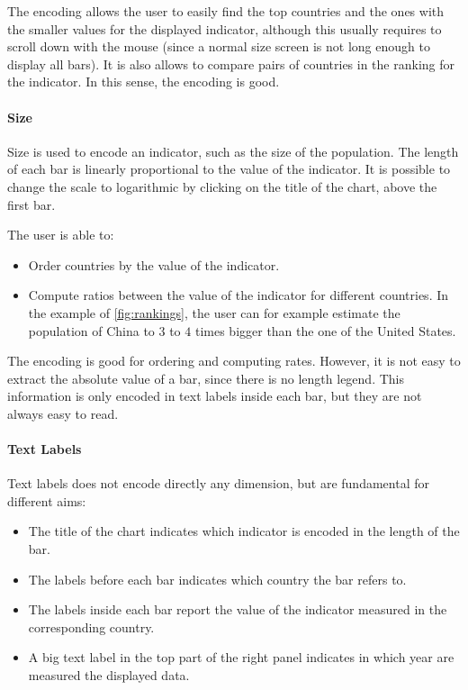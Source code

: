The encoding allows the user to easily find the top countries and the ones with the smaller values for the displayed indicator, although this usually requires to scroll down with the mouse (since a normal size screen is not long enough to display all bars).
It is also allows to compare pairs of countries in the ranking for the indicator.
In this sense, the encoding is good.

\paragraph{Size}
Size is used to encode an indicator, such as the size of the population.
The length of each bar is linearly proportional to the value of the indicator.
It is possible to change the scale to logarithmic by clicking on the title of the chart, above the first bar.

The user is able to:
\begin{itemize}
	\item Order countries by the value of the indicator.
	\item Compute ratios between the value of the indicator for different countries. In the example of \cref{fig:rankings}, the user can for example estimate the population of China to $3$ to $4$ times bigger than the one of the United States.
\end{itemize}

The encoding is good for ordering and computing rates.
However, it is not easy to extract the absolute value of a bar, since there is no length legend.
This information is only encoded in text labels inside each bar, but they are not always easy to read.

\paragraph{Text Labels}
Text labels does not encode directly any dimension, but are fundamental for different aims:
\begin{itemize}
	\item The title of the chart indicates which indicator is encoded in the length of the bar.
	\item The labels before each bar indicates which country the bar refers to.
	\item The labels inside each bar report the value of the indicator measured in the corresponding country.
	\item A big text label in the top part of the right panel indicates in which year are measured the displayed data.
\end{itemize}


